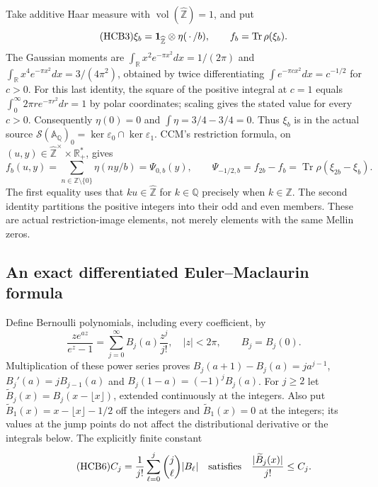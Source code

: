 \documentclass[11pt]{article}
\begin{document}
Take additive Haar measure with $\operatorname{vol}(\widehat{\mathbb
Z})=1$, and put
\begin{equation}\tag{HCB3}
 \xi_b={\bf1}_{\widehat{\mathbb Z}}\otimes\eta(\,\cdot\,/b),
 \qquad f_b=\operatorname{Tr}\rho(\xi_b).
\end{equation}
The Gaussian moments are
$\int_{\mathbb R}x^2e^{-\pi x^2}dx=1/(2\pi)$ and
$\int_{\mathbb R}x^4e^{-\pi x^2}dx=3/(4\pi^2)$, obtained by
twice differentiating $\int e^{-\pi c x^2}dx=c^{-1/2}$ for $c>0$.
For this last identity, the square of the positive integral at
$c=1$ equals $\int_0^\infty 2\pi r e^{-\pi r^2}dr=1$ by polar
coordinates; scaling gives the stated value for every $c>0$.
Consequently $\eta(0)=0$ and $\int\eta=3/4-3/4=0$.
Thus $\xi_b$ is in the actual source
$\mathcal S(\mathbb A_{\mathbb Q})_0=\ker\varepsilon_0\cap
\ker\varepsilon_1$. CCM's restriction formula, on
$(u,y)\in\widehat{\mathbb Z}^{\times}\times\mathbb R_+^*$, gives
\begin{equation}\tag{HCB4}
 f_b(u,y)=\sum_{n\in\mathbb Z\setminus\{0\}}\eta(ny/b)
       =\Psi_{0,b}(y),\qquad
 \Psi_{-1/2,b}=f_{2b}-f_b
       =\operatorname{Tr}\rho(\xi_{2b}-\xi_b).
\end{equation}
The first equality uses that $ku\in\widehat{\mathbb Z}$ for
$k\in\mathbb Q$ precisely when $k\in\mathbb Z$. The second identity
partitions the positive integers into their odd and even members.
These are actual restriction-image elements, not merely elements
with the same Mellin zeros.

\subsection{An exact differentiated Euler--Maclaurin formula}

Define Bernoulli polynomials, including every coefficient, by
\begin{equation}\tag{HCB5}
 \frac{z e^{a z}}{e^z-1}=\sum_{j=0}^{\infty}B_j(a)\frac{z^j}{j!},
 \quad |z|<2\pi,\qquad B_j=B_j(0).
\end{equation}
Multiplication of these power series proves
$B_j(a+1)-B_j(a)=j a^{j-1}$,
$B_j'(a)=jB_{j-1}(a)$ and
$B_j(1-a)=(-1)^jB_j(a)$. For $j\geq2$ let
$\widetilde B_j(x)=B_j(x-\lfloor x\rfloor)$, extended continuously
at the integers. Also put
$\widetilde B_1(x)=x-\lfloor x\rfloor-1/2$ off the integers and
$\widetilde B_1(x)=0$ at the integers; its values at the jump points
do not affect the distributional derivative or the integrals below.
The explicitly finite constant
\begin{equation}\tag{HCB6}
 C_j=\frac1{j!}\sum_{\ell=0}^j\binom j\ell |B_\ell|
 \quad\hbox{satisfies}\quad
 \frac{|\widetilde B_j(x)|}{j!}\leq C_j.
\end{equation}
\end{document}
